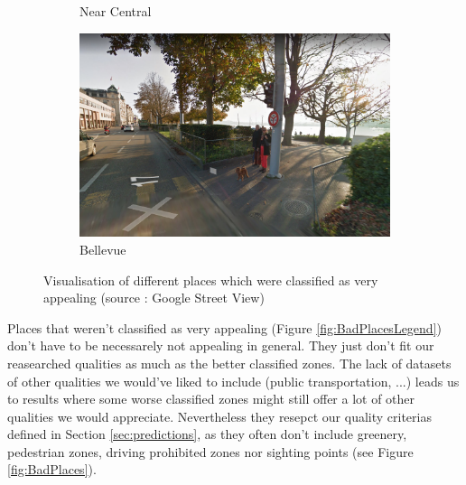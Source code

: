 \documentclass[letterpaper]{article}
\begin{document}
\begin{figure}[H]
\begin{subfigure}[t]{.45\columnwidth}
        \caption[width=.9\linewidth]{Near Central}
    \end{subfigure}\hspace{0.05\columnwidth}
    \begin{subfigure}[t]{.45\columnwidth}
        \centering
        \includegraphics[width=\linewidth]{images/good/bellevue.png}
        \caption[width=.9\linewidth]{Bellevue}
    \end{subfigure}\vspace{1mm}
    \caption{Visualisation of different places which were classified as very appealing (source : Google Street View)}
    \label{fig:NicePlaces}
\end{figure}

Places that weren't classified as very appealing (Figure \ref{fig:BadPlacesLegend}) don't have to be necessarely not appealing in general. They just don't fit
our reasearched qualities as much as the better classified zones. The lack of datasets of other qualities we would've
liked to include (public transportation, ...) leads us to results where some worse classified zones might still
offer a lot of other qualities we would appreciate. Nevertheless they resepct our quality criterias defined in Section \ref{sec:predictions}, as they
often don't include greenery, pedestrian zones, driving prohibited zones nor sighting points (see Figure \ref{fig:BadPlaces}).
\end{document}
